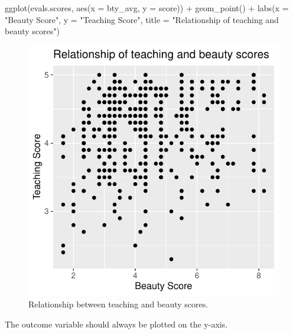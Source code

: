 \documentclass[
  letterpaper,
  DIV=11,
  numbers=noendperiod]{scrartcl}
\newenvironment{Shaded}{\begin{snugshade}}{\end{snugshade}}
\newcommand{\AttributeTok}[1]{\textcolor[rgb]{0.40,0.45,0.13}{#1}}
\newcommand{\FunctionTok}[1]{\textcolor[rgb]{0.28,0.35,0.67}{#1}}
\newcommand{\NormalTok}[1]{\textcolor[rgb]{0.00,0.23,0.31}{#1}}
\newcommand{\SpecialCharTok}[1]{\textcolor[rgb]{0.37,0.37,0.37}{#1}}
\newcommand{\StringTok}[1]{\textcolor[rgb]{0.13,0.47,0.30}{#1}}
\begin{document}
\begin{Shaded}
\begin{Highlighting}[]
\FunctionTok{ggplot}\NormalTok{(evals.scores, }\FunctionTok{aes}\NormalTok{(}\AttributeTok{x =}\NormalTok{ bty\_avg, }\AttributeTok{y =}\NormalTok{ score)) }\SpecialCharTok{+}
  \FunctionTok{geom\_point}\NormalTok{() }\SpecialCharTok{+}
  \FunctionTok{labs}\NormalTok{(}\AttributeTok{x =} \StringTok{"Beauty Score"}\NormalTok{, }\AttributeTok{y =} \StringTok{"Teaching Score"}\NormalTok{, }\AttributeTok{title =} \StringTok{"Relationship of teaching and beauty scores"}\NormalTok{)}
\end{Highlighting}
\end{Shaded}

\begin{figure}[H]

{\centering \includegraphics{index_files/figure-pdf/unnamed-chunk-4-1.pdf}

}

\caption{Relationship between teaching and beauty scores.}

\end{figure}%

\begin{tcolorbox}[enhanced jigsaw, opacityback=0, arc=.35mm, coltitle=black, toprule=.15mm, colback=white, opacitybacktitle=0.6, left=2mm, breakable, rightrule=.15mm, colbacktitle=quarto-callout-note-color!10!white, bottomrule=.15mm, bottomtitle=1mm, toptitle=1mm, titlerule=0mm, title=\textcolor{quarto-callout-note-color}{\faInfo}\hspace{0.5em}{Note}, leftrule=.75mm, colframe=quarto-callout-note-color-frame]

The outcome variable should always be plotted on the y-axis.

\end{tcolorbox}
\end{document}
